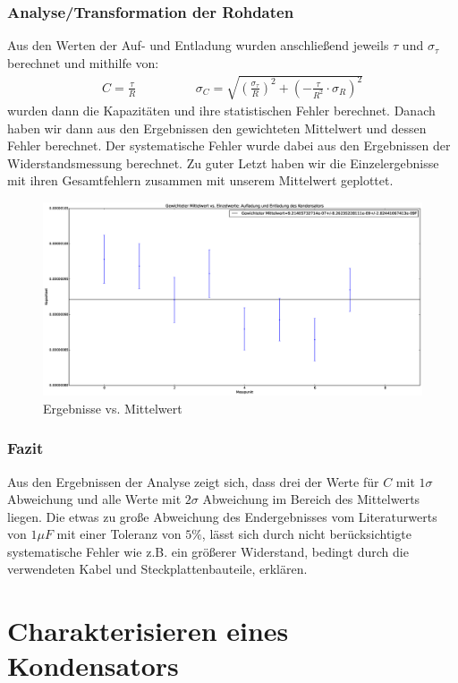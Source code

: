 \documentclass[12pt,a4paper]{article}
\begin{document}
\subsubsection{Analyse/Transformation der Rohdaten}
Aus den Werten der Auf- und Entladung wurden anschließend jeweils $\tau$ und $\sigma_{\tau}$ berechnet und mithilfe von:
\begin{align*}
C=\frac{\tau}{R} \hspace{2cm} \sigma_C=\sqrt{(\frac{\sigma_{\tau}}{R})^2+(-\frac{\tau}{R^2}\cdot \sigma_R)^2}
\end{align*}
wurden dann die Kapazitäten und ihre statistischen Fehler berechnet.
Danach haben wir dann aus den Ergebnissen den gewichteten Mittelwert und dessen Fehler berechnet. Der systematische Fehler wurde dabei aus den Ergebnissen der Widerstandsmessung berechnet.
Zu guter Letzt haben wir die Einzelergebnisse mit ihren Gesamtfehlern zusammen mit unserem Mittelwert geplottet.
\begin{figure}[hbtp]
\centering
\includegraphics[scale=0.3]{auf-entladung.eps}
\caption{Ergebnisse vs. Mittelwert}
\end{figure}
\subsubsection{Fazit}
Aus den Ergebnissen der Analyse zeigt sich, dass drei der Werte für $C$ mit $1\sigma$ Abweichung und alle Werte mit $2\sigma$ Abweichung im Bereich des Mittelwerts liegen. Die etwas zu große Abweichung des Endergebnisses vom Literaturwerts von $1\mu F$ mit einer Toleranz von $5 \%$, lässt sich durch nicht berücksichtigte systematische Fehler wie z.B. ein größerer Widerstand, bedingt durch die verwendeten Kabel und Steckplattenbauteile, erklären.
\section{Charakterisieren eines Kondensators}
\end{document}
